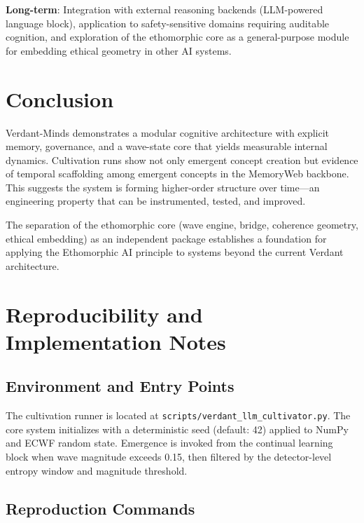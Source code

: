 \documentclass[11pt,a4paper]{article}
\begin{document}
\textbf{Long-term}: Integration with external reasoning backends (LLM-powered 
language block), application to safety-sensitive domains requiring auditable 
cognition, and exploration of the ethomorphic core as a general-purpose 
module for embedding ethical geometry in other AI systems.

\section{Conclusion}

Verdant-Minds demonstrates a modular cognitive architecture with explicit 
memory, governance, and a wave-state core that yields measurable internal 
dynamics. Cultivation runs show not only emergent concept creation but 
evidence of temporal scaffolding among emergent concepts in the MemoryWeb 
backbone. This suggests the system is forming higher-order structure over 
time---an engineering property that can be instrumented, tested, and improved.

The separation of the ethomorphic core (wave engine, bridge, coherence 
geometry, ethical embedding) as an independent package establishes a 
foundation for applying the Ethomorphic AI principle to systems beyond the 
current Verdant architecture.

\appendix
\section{Reproducibility and Implementation Notes}

\subsection{Environment and Entry Points}

The cultivation runner is located at \texttt{scripts/verdant\_llm\_cultivator.py}. 
The core system initializes with a deterministic seed (default: 42) applied to 
NumPy and ECWF random state. Emergence is invoked from the continual learning 
block when wave magnitude exceeds 0.15, then filtered by the detector-level 
entropy window and magnitude threshold.

\subsection{Reproduction Commands}
\end{document}
